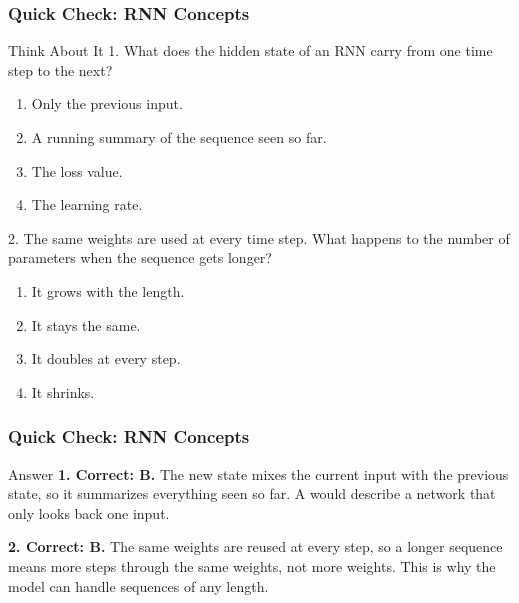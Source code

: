 \begin{frame}[fragile]\frametitle{Quick Check: RNN Concepts}
\begin{block}{Think About It}
1. What does the hidden state of an RNN carry from one time step to the next?
\begin{enumerate}
  \item[A.] Only the previous input.
  \item[B.] A running summary of the sequence seen so far.
  \item[C.] The loss value.
  \item[D.] The learning rate.
\end{enumerate}
2. The same weights are used at every time step. What happens to the number of parameters when the sequence gets longer?
\begin{enumerate}
  \item[A.] It grows with the length.
  \item[B.] It stays the same.
  \item[C.] It doubles at every step.
  \item[D.] It shrinks.
\end{enumerate}
\end{block}
\end{frame}

\begin{frame}[fragile]\frametitle{Quick Check: RNN Concepts}
\begin{block}{Answer}
\textbf{1. Correct: B.} The new state mixes the current input with the previous state, so it summarizes everything seen so far. A would describe a network that only looks back one input.

\textbf{2. Correct: B.} The same weights are reused at every step, so a longer sequence means more steps through the same weights, not more weights. This is why the model can handle sequences of any length.
\end{block}
\end{frame}

